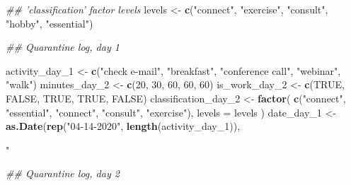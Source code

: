 \documentclass[]{book}
\newenvironment{Shaded}{\begin{snugshade}}{\end{snugshade}}
\newcommand{\CommentTok}[1]{\textcolor[rgb]{0.56,0.35,0.01}{\textit{#1}}}
\newcommand{\DataTypeTok}[1]{\textcolor[rgb]{0.13,0.29,0.53}{#1}}
\newcommand{\DecValTok}[1]{\textcolor[rgb]{0.00,0.00,0.81}{#1}}
\newcommand{\KeywordTok}[1]{\textcolor[rgb]{0.13,0.29,0.53}{\textbf{#1}}}
\newcommand{\NormalTok}[1]{#1}
\newcommand{\OtherTok}[1]{\textcolor[rgb]{0.56,0.35,0.01}{#1}}
\newcommand{\StringTok}[1]{\textcolor[rgb]{0.31,0.60,0.02}{#1}}
\begin{document}
\begin{Shaded}
\begin{Highlighting}[]
\CommentTok{## 'classification' factor levels}
\NormalTok{levels <-}\StringTok{ }\KeywordTok{c}\NormalTok{(}\StringTok{"connect"}\NormalTok{, }\StringTok{"exercise"}\NormalTok{, }\StringTok{"consult"}\NormalTok{, }\StringTok{"hobby"}\NormalTok{, }\StringTok{"essential"}\NormalTok{)}

\CommentTok{## Quarantine log, day 1}

\NormalTok{activity_day_}\DecValTok{1}\NormalTok{ <-}
\StringTok{    }\KeywordTok{c}\NormalTok{(}\StringTok{"check e-mail"}\NormalTok{, }\StringTok{"breakfast"}\NormalTok{, }\StringTok{"conference call"}\NormalTok{, }\StringTok{"webinar"}\NormalTok{, }\StringTok{"walk"}\NormalTok{)}
\NormalTok{minutes_day_}\DecValTok{2}\NormalTok{ <-}\StringTok{ }\KeywordTok{c}\NormalTok{(}\DecValTok{20}\NormalTok{, }\DecValTok{30}\NormalTok{, }\DecValTok{60}\NormalTok{, }\DecValTok{60}\NormalTok{, }\DecValTok{60}\NormalTok{)}
\NormalTok{is_work_day_}\DecValTok{2}\NormalTok{ <-}\StringTok{ }\KeywordTok{c}\NormalTok{(}\OtherTok{TRUE}\NormalTok{, }\OtherTok{FALSE}\NormalTok{, }\OtherTok{TRUE}\NormalTok{, }\OtherTok{TRUE}\NormalTok{, }\OtherTok{FALSE}\NormalTok{)}
\NormalTok{classification_day_}\DecValTok{2}\NormalTok{ <-}\StringTok{ }\KeywordTok{factor}\NormalTok{(}
    \KeywordTok{c}\NormalTok{(}\StringTok{"connect"}\NormalTok{, }\StringTok{"essential"}\NormalTok{, }\StringTok{"connect"}\NormalTok{, }\StringTok{"consult"}\NormalTok{, }\StringTok{"exercise"}\NormalTok{),}
    \DataTypeTok{levels =}\NormalTok{ levels}
\NormalTok{)}
\NormalTok{date_day_}\DecValTok{1}\NormalTok{ <-}\StringTok{ }\KeywordTok{as.Date}\NormalTok{(}\KeywordTok{rep}\NormalTok{(}\StringTok{"04-14-2020"}\NormalTok{, }\KeywordTok{length}\NormalTok{(activity_day_}\DecValTok{1}\NormalTok{)), }\StringTok{"%

\CommentTok{## Quarantine log, day 2}

}
\end{Highlighting}
\end{Shaded}
\end{document}

